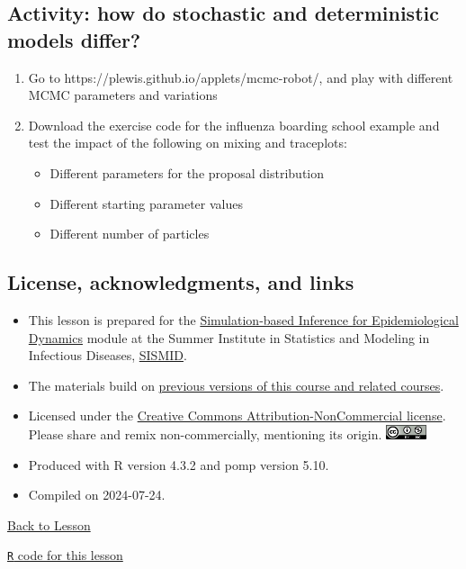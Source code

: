 \documentclass[
  letterpaper,
  DIV=11,
  numbers=noendperiod]{scrartcl}
\providecommand{\tightlist}{%
  \setlength{\itemsep}{0pt}\setlength{\parskip}{0pt}}\usepackage{longtable,booktabs,array}
\begin{document}
\hypertarget{activity-how-do-stochastic-and-deterministic-models-differ}{%
\subsection{Activity: how do stochastic and deterministic models
differ?}\label{activity-how-do-stochastic-and-deterministic-models-differ}}

\Large

\begin{enumerate}
\def\labelenumi{\arabic{enumi}.}
\tightlist
\item
  Go to https://plewis.github.io/applets/mcmc-robot/, and play with
  different MCMC parameters and variations
\item
  Download the exercise code for the influenza boarding school example
  and test the impact of the following on mixing and traceplots:

  \begin{itemize}
  \tightlist
  \item
    Different parameters for the proposal distribution
  \item
    Different starting parameter values
  \item
    Different number of particles
  \end{itemize}
\end{enumerate}

\hypertarget{license-acknowledgments-and-links}{%
\subsection{License, acknowledgments, and
links}\label{license-acknowledgments-and-links}}

\begin{itemize}
\item
  This lesson is prepared for the
  \href{https://rubbislam.quarto.pub/episim/}{Simulation-based Inference
  for Epidemiological Dynamics} module at the Summer Institute in
  Statistics and Modeling in Infectious Diseases,
  \href{https://sph.emory.edu/SISMID/index.html}{SISMID}.
\item
  The materials build on \href{../acknowledge.html}{previous versions of
  this course and related courses}.
\item
  Licensed under the
  \href{https://creativecommons.org/licenses/by-nc/4.0/}{Creative
  Commons Attribution-NonCommercial license}. Please share and remix
  non-commercially, mentioning its origin.
  \includegraphics[height=12pt]{../graphics/cc-by-nc}
\item
  Produced with R version 4.3.2 and pomp version 5.10.
\item
  Compiled on 2024-07-24.
\end{itemize}

\vfill

\href{index.html}{Back to Lesson}

\href{./main.R}{\texttt{R} code for this lesson}
\end{document}
